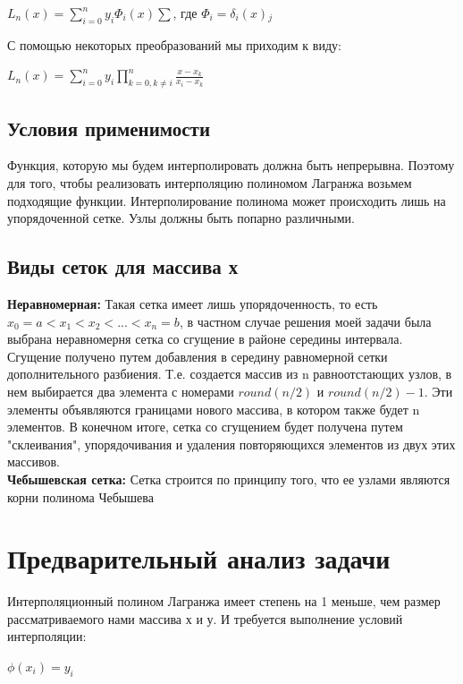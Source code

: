 \documentclass[a4paper]{article}
\begin{document}
\begin{center}
$L_n (x) =\sum_{i=0}^n y_i \Phi_i(x)\sum$, где $ \Phi_i = \delta_i(x){}_j$ 
\end{center}

\begin{flushleft}
С помощью некоторых преобразований мы приходим к виду:\\
\end{flushleft}
\begin{center}
$L_n (x) =\sum_{i=0}^n y_i \prod\limits_{ {k = 0}, {k \neq i} }^n \frac{x-x_k}{x_i-x_k}$
\end{center}
\subsection{Условия применимости}
Функция, которую мы будем интерполировать должна быть непрерывна. Поэтому для того, чтобы реализовать интерполяцию полиномом Лагранжа возьмем подходящие функции. Интерполирование полинома может происходить лишь на упорядоченной сетке. Узлы должны быть попарно различными.
\subsection{Виды сеток для массива х} 
\textbf{Неравномерная:} 
Такая сетка имеет лишь упорядоченность, то есть $ x_0 = a < x_1<x_2<...<x_n = b$, в частном случае решения моей задачи была выбрана неравномерня сетка со сгущение в районе середины интервала.
Сгущение получено путем добавления в середину равномерной сетки дополнительного разбиения. Т.е. создается массив из n равноотстающих узлов, в нем выбирается два элемента с номерами $round(n/2)$ и $round(n/2)-1$. Эти элементы объявляются границами нового массива, в котором также будет n элементов. В конечном итоге, сетка со сгущением будет получена путем "склеивания", упорядочивания и удаления повторяющихся элементов из двух этих массивов.  \\ 
\textbf{Чебышевская сетка:} Сетка строится по принципу того, что ее узлами являются корни полинома Чебышева\\

 
\section{Предварительный анализ задачи} 
Интерполяционный полином Лагранжа имеет степень на 1 меньше, чем размер рассматриваемого нами массива х и у. И требуется выполнение условий интерполяции: 
\begin{center}
$ \phi(x_i) = y_i$ 
\end{center}
\end{document}
